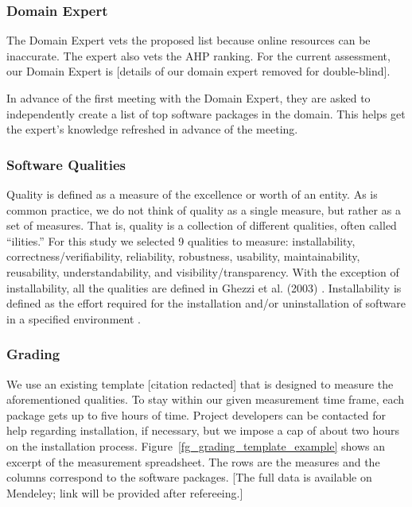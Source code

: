 \documentclass[doubleblind,12pt, 3p, times]{elsarticle}
\begin{document}
\subsubsection{Domain Expert} \label{sec_vet_software_list}

The Domain Expert vets the proposed list because online resources can be
inaccurate.  The expert also vets the AHP ranking.  For the current assessment,
our Domain Expert is [details of our domain expert removed for double-blind].

In advance of the first meeting with the Domain Expert, they are asked to
independently create a list of top software packages in the domain.  This helps
get the expert's knowledge refreshed in advance of the meeting.

\subsubsection{Software Qualities} \label{sec_software_quality}

Quality is defined as a measure of the excellence or worth of an entity.  As is
common practice, we do not think of quality as a single measure, but rather as
a set of measures.  That is, quality is a collection of different qualities,
often called ``ilities.''  For this study we selected 9 qualities to measure:
installability, correctness/verifiability, reliability, robustness, usability,
maintainability, reusability, understandability, and visibility/transparency.
With the exception of installability, all the qualities are defined in Ghezzi
et al. (2003) \cite{GhezziEtAl2003}. Installability is defined as the effort
required for the installation and/or uninstallation of software in a specified
environment \cite{ISO/IEC25010}.

\subsubsection{Grading} \label{sec_grading_software}

We use an existing template [citation redacted]
that is designed to measure the
aforementioned qualities. To stay within our given measurement time frame, each
package gets up to five hours of time.  Project developers can be contacted for
help regarding installation, if necessary, but we impose a cap of about two
hours on the installation process.  Figure~\ref{fg_grading_template_example}
shows an excerpt of the measurement spreadsheet.  The rows are the measures and
the columns correspond to the software packages.  [The full data is available on
Mendeley; link will be provided after refereeing.] 
\end{document}

